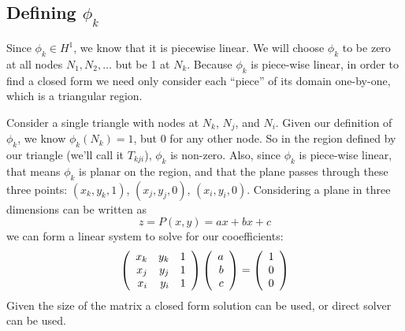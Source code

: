 \subsection{Defining $\phi_k$}
Since $\phi_k \in H^1$, we know that it is piecewise linear. We will choose $\phi_k$ to be zero at all nodes
$N_1, N_2, \ldots$ but be 1 at $N_k$. Because $\phi_k$ is piece-wise linear,
in order to find a closed form we need only consider each ``piece'' of its domain one-by-one, which is a triangular region.

Consider a single triangle with nodes at $N_k$, $N_j$, and $N_i$. Given our definition of $\phi_k$, we know $\phi_k(N_k) = 1$,
but 0 for any other node. So in the region defined by our triangle (we'll call it $T_{kji}$), $\phi_k$ is non-zero. Also, since
$\phi_k$ is piece-wise linear, that means $\phi_k$ is planar on the region, and that the plane passes through these three points:
$(x_k, y_k, 1)$, $(x_j, y_j, 0)$, $(x_i, y_i, 0)$. Considering a plane in three dimensions can be written as
\begin{equation} \label{eq:plane}
z = P(x, y) = ax + bx + c
\end{equation}
we can form a linear system to solve for our cooefficients:
\begin{equation} \label{eq:plane_solution}
\left(\begin{array}{rrrrrr} 
    x_k & y_k & 1 \\
    x_j & y_j & 1 \\
    x_i & y_i & 1
 \\ \end{array} \right)
\left(\begin{array}{rrrrrr} a \\ b \\ c \\ \end{array} \right)
=
\left(\begin{array}{rrrrrr} 1 \\ 0 \\ 0 \\ \end{array} \right)
\end{equation}
Given the size of the matrix a closed form solution can be used, or direct solver can be used.
